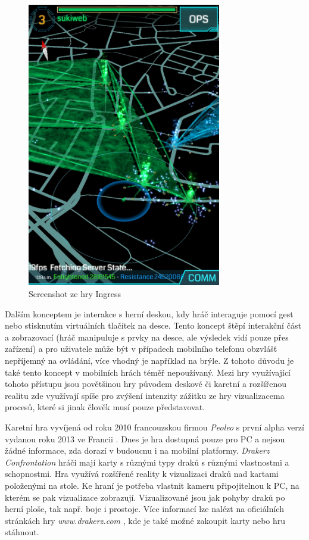 \documentclass[twoside,12pt]{article}
\begin{document}
\begin{figure}[H]
    \includegraphics[width=320px, center]{images/ingress.jpg}
    \caption{Screenshot ze hry Ingress}
    \label{ingress_screenshot}
\end{figure}

Dalším konceptem je interakce s herní deskou, kdy hráč interaguje pomocí gest nebo stisknutím virtuálních tlačítek na desce. Tento koncept štěpí interakční část a zobrazovací (hráč manipuluje s prvky na desce, ale výsledek vidí pouze přes zařízení) a pro uživatele může být v případech mobilního telefonu obzvlášť nepříjemný na ovládání, více vhodný je například na brýle. Z tohoto důvodu je také tento koncept v mobilních hrách téměř nepoužívaný. Mezi hry využívající tohoto přístupu jsou povětšinou hry původem deskové či karetní a rozšířenou realitu zde využívají spíše pro zvýšení intenzity zážitku ze hry vizualizacema procesů, které si jinak člověk musí pouze představovat. 

%
%

Karetní hra vyvíjená od roku 2010 francouzskou firmou \textit{Peoleo} s první alpha verzí vydanou roku 2013 ve Francii \cite{venturebeat}. Dnes je hra dostupná pouze pro PC a nejsou žádné informace, zda dorazí v budoucnu i na mobilní platformy. \textit{Drakerz Confrontation} hráči mají karty s různými typy draků s různými vlastnostmi a schopnostmi. Hra využívá rozšířené reality k vizualizaci draků nad kartami položenými na stole. Ke hraní je potřeba vlastnit kameru připojitelnou k PC, na kterém se pak vizualizace zobrazují. Vizualizované jsou jak pohyby draků po herní ploše, tak např. boje i prostoje. Více informací lze nalézt na oficiálních stránkách hry \textit{www.drakerz.com} \cite{peoleo_about}, kde je také možné zakoupit karty nebo hru stáhnout.
\end{document}
